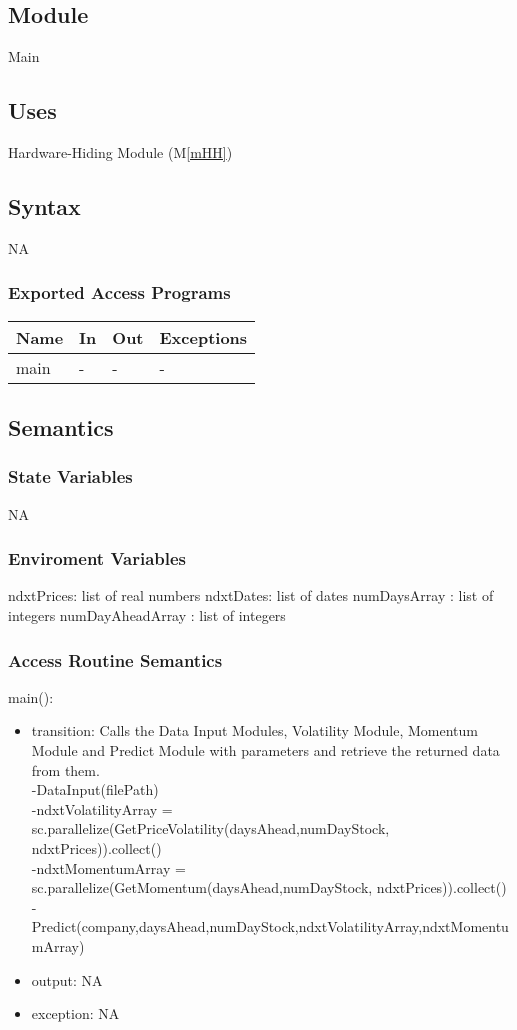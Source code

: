 \documentclass[12pt, titlepage]{article}
\newcommand{\mref}[1]{M\ref{#1}}
\begin{document}
\subsection{Module}
Main
\subsection{Uses}
Hardware-Hiding Module (\mref{mHH})

\subsection{Syntax}
NA
\subsubsection{Exported Access Programs}

\begin{center}
\begin{tabular}{p{2cm} p{4cm} p{4cm} p{2cm}}
\hline
\textbf{Name} & \textbf{In} & \textbf{Out} & \textbf{Exceptions} \\
\hline

main & - &- & - \\
\hline
\end{tabular}
\end{center}

\subsection{Semantics}
\subsubsection{State Variables}
NA
\subsubsection{Enviroment Variables}
ndxtPrices: list of real numbers
ndxtDates: list of dates
numDaysArray : list of integers
numDayAheadArray : list of integers
\subsubsection{Access Routine Semantics}

\noindent main():
\begin{itemize}
\item transition: Calls the Data Input Modules, Volatility Module, Momentum Module and Predict Module with parameters and retrieve the returned data from them. \\
-DataInput(filePath)\\
-ndxtVolatilityArray = sc.parallelize(GetPriceVolatility(daysAhead,numDayStock, ndxtPrices)).collect()\\ 
-ndxtMomentumArray = sc.parallelize(GetMomentum(daysAhead,numDayStock, ndxtPrices)).collect()\\
-Predict(company,daysAhead,numDayStock,ndxtVolatilityArray,ndxtMomentumArray)
\item output: NA
\item exception: NA
\end{itemize}
\end{document}
